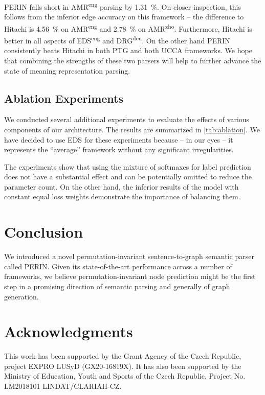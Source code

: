 \documentclass[11pt,a4paper]{article}
\begin{document}
PERIN falls short in AMR\textsuperscript{eng} parsing by 1.31~\%. On closer inspection, this follows from the inferior edge accuracy on this framework -- the difference to Hitachi is 4.56~\% on AMR\textsuperscript{eng} and 2.78~\% on AMR\textsuperscript{zho}. Furthermore, Hitachi is better in all aspects of EDS\textsuperscript{eng} and DRG\textsuperscript{deu}. On the other hand PERIN consistently beats Hitachi in both PTG and both UCCA frameworks. We hope that combining the strengths of these two parsers will help to further advance the state of meaning representation parsing.

\goodbreak
\subsection{Ablation Experiments}

We conducted several additional experiments to evaluate the effects of various components of our  architecture. The results are summarized in \autoref{tab:ablation}. We have decided to use EDS for these experiments because -- in our eyes -- it represents the ``average'' framework without any significant irregularities.

The experiments show that using the mixture of softmaxes for label prediction does not have a substantial effect and can be potentially omitted to reduce the parameter count. On the other hand, the inferior results of the model with constant equal loss weights demonstrate the importance of balancing them. \section{Conclusion}

We introduced a novel permutation-invariant sentence-to-graph semantic parser called PERIN. Given its state-of-the-art performance across a number of frameworks, we believe permutation-invariant node prediction might be the first step in a promising direction of semantic parsing and generally of graph generation. \vspace*{\fill}
\section*{Acknowledgments}

This work has been supported by the Grant Agency of the Czech Republic,
project EXPRO LUSyD (GX20-16819X). It has also been supported by the Ministry of Education, Youth and Sports of the Czech Republic, Project No. LM2018101 LINDAT/CLARIAH-CZ.

\clearpage 


\end{document}
